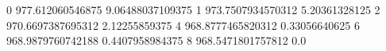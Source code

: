 0 977.612060546875 9.06488037109375
1 973.7507934570312 5.20361328125
2 970.6697387695312 2.12255859375
4 968.8777465820312 0.33056640625
6 968.9879760742188 0.4407958984375
8 968.5471801757812 0.0
